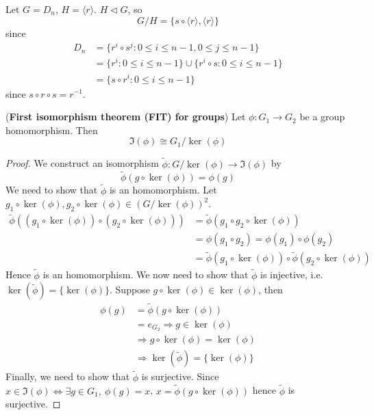 \begin{example}\label{exa:quotientGroup3}
	Let $G = D_n$, $H = \langle r \rangle$. $H \triangleleft G$, so
	\[
		G / H = \{ s \circ \langle r \rangle, \langle r \rangle \}
	\]
	since
	\[
		\begin{aligned}
			D_n
				& = \{ r^i \circ s^j: 0 \le i \le n - 1, 0 \le j \le n - 1 \} \\
				& = \{ r^i: 0 \le i \le n - 1 \} \cup \{ r^i \circ s: 0 \le i \le n - 1 \} \\
				& = \{ s \circ r^i: 0 \le i \le n - 1 \}
		\end{aligned}
	\]
	since $s \circ r \circ s = r^{-1}$.
\end{example}

\begin{theorem}
	(\textbf{First isomorphism theorem (FIT) for groups}) Let $\phi: G_1 \rightarrow G_2$ be a group homomorphism. Then
	\[
		\Im(\phi) \cong G_1 / \ker(\phi)
	\]
\end{theorem}

\begin{proof}
	We construct an isomorphism $\tilde{\phi}: G / \ker(\phi) \rightarrow \Im(\phi)$ by
	\[
		\tilde{\phi}(g \circ \ker(\phi)) = \phi(g)
	\]
	We need to show that $\tilde{\phi}$ is an homomorphism. Let $g_1 \circ \ker(\phi), g_2 \circ \ker(\phi) \in {(G / \ker(\phi))}^2$.
	\[
		\begin{aligned}
			\tilde{\phi}((g_1 \circ \ker(\phi)) \circ (g_2 \circ \ker(\phi)))
				& = \tilde{\phi} (g_1 \circ g_2 \circ \ker(\phi)) \\
				& = \phi(g_1 \circ g_2) = \phi(g_1) \circ \phi(g_2) \\
				& = \tilde{\phi}(g_1 \circ \ker(\phi)) \circ \tilde{\phi}(g_2 \circ \ker(\phi))
		\end{aligned}
	\]
	Hence $\tilde{\phi}$ is an homomorphism. We now need to show that $\tilde{\phi}$ is injective, i.e. $\ker(\tilde{\phi}) = \{ \ker(\phi) \}$. Suppose $g \circ \ker(\phi) \in \ker(\phi)$, then
	\[
		\begin{aligned}
			\phi(g) & = \tilde{\phi}(g \circ \ker(\phi)) \\
			& = e_{G_2} \Longrightarrow g \in \ker(\phi) \\
			& \Longrightarrow g \circ \ker(\phi) = \ker(\phi) \\
			& \Longrightarrow \ker(\tilde{\phi}) = \{ \ker(\phi) \}
		\end{aligned}
	\]
	Finally, we need to show that $\tilde{\phi}$ is surjective. Since $x \in \Im(\phi) \Longleftrightarrow \exists g \in G_1, \ \phi(g) = x$, $x = \tilde{\phi}(g \circ \ker(\phi))$ hence $\tilde{\phi}$ is surjective.
\end{proof}

